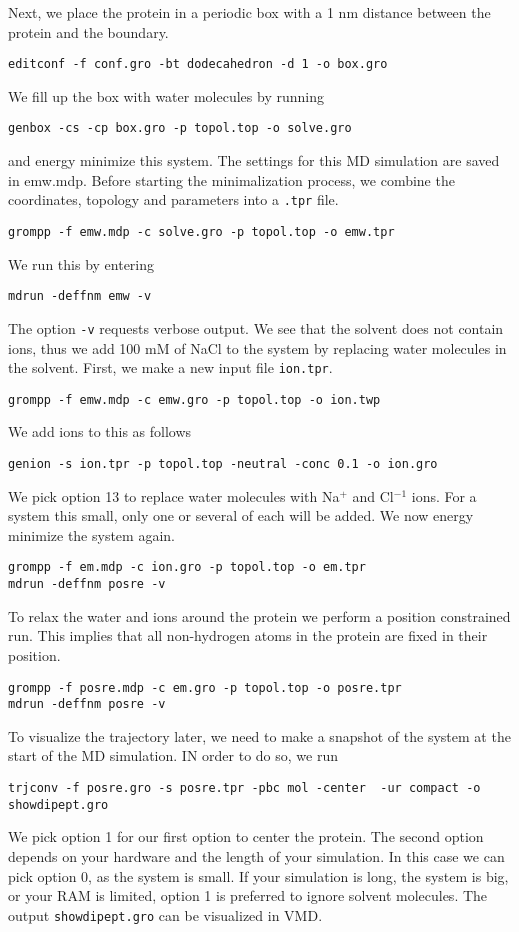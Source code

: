 \documentclass[]{article}
\begin{document}
Next, we place the protein in a periodic box with a 1 nm distance between the protein and the boundary.
%
\begin{lstlisting}
editconf -f conf.gro -bt dodecahedron -d 1 -o box.gro
\end{lstlisting}
% 
We fill up the box with water molecules by running
%
\begin{lstlisting}
genbox -cs -cp box.gro -p topol.top -o solve.gro
\end{lstlisting}
%
and energy minimize this system. The settings for this MD simulation are saved in emw.mdp. Before starting the minimalization process, we combine the coordinates, topology and parameters into a \texttt{.tpr} file.
%
\begin{lstlisting}
grompp -f emw.mdp -c solve.gro -p topol.top -o emw.tpr
\end{lstlisting}
%
We run this by entering
%
\begin{lstlisting}
mdrun -deffnm emw -v
\end{lstlisting}
%
The option \texttt{-v} requests verbose output. We see that the solvent does not contain ions, thus we add 100 mM of NaCl to the system by replacing water molecules in the solvent. First, we make a new input file \texttt{ion.tpr}.
%
\begin{lstlisting}
grompp -f emw.mdp -c emw.gro -p topol.top -o ion.twp
\end{lstlisting}
%
We add ions to this as follows
%
\begin{lstlisting}
genion -s ion.tpr -p topol.top -neutral -conc 0.1 -o ion.gro
\end{lstlisting}
%
We pick option 13 to replace water molecules with Na$^+$ and Cl$^{-1}$ ions. For a system this small, only one or several of each will be added. We now energy minimize the system again.
%
\begin{lstlisting}
grompp -f em.mdp -c ion.gro -p topol.top -o em.tpr
mdrun -deffnm posre -v
\end{lstlisting}
% 
To relax the water and ions around the protein we perform a position constrained run. This implies that all non-hydrogen atoms in the protein are fixed in their position.
%
\begin{lstlisting}
grompp -f posre.mdp -c em.gro -p topol.top -o posre.tpr
mdrun -deffnm posre -v
\end{lstlisting}
%
To visualize the trajectory later, we need to make a snapshot of the system at the start of the MD simulation. IN order to do so, we run
%
\begin{lstlisting}
trjconv -f posre.gro -s posre.tpr -pbc mol -center  -ur compact -o showdipept.gro
\end{lstlisting}
%
We pick option 1 for our first option to center the protein. The second option depends on your hardware and the length of your simulation. In this case we can pick option 0, as the system is small. If your simulation is long, the system is big, or your RAM is limited, option 1 is preferred to ignore solvent molecules. The output \texttt{showdipept.gro} can be visualized in VMD.
\end{document}
